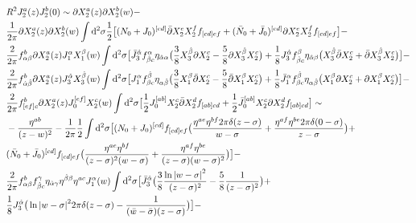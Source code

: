 \documentclass[12pt]{article}
\numberwithin{equation}{section}
\newcommand{\h}[1]{\hat{#1}}
\begin{document}
{\allowdisplaybreaks
\begin{align}
	&R^2 J_2^a(z) J_2^b(0) \sim \partial X_2^a(z) \partial X_2^b(w) - \nonumber \\
	&\frac{1}{2\pi} \partial X_2^a(z) \partial X_2^b(w) \int \dd^2 \sigma \frac{1}{2} \big[(N_0 + J_0)^{[cd]} \bar{\partial} X_2^e X_2 ^f f_{[cd]ef} + (\bar{N}_0 + \bar{J}_0)^{[cd]} \partial X_2^e X_2 ^f f_{[cd]ef}\big]  - \nonumber \\
	&\frac{2}{2\pi}f^{b}_{\alpha \beta} \partial X_2^a(z) J_1^\alpha X_1^\beta(w) \int \dd^2 \sigma \big[\bar{J}_3^{\h{\alpha}} f_{\h{\beta} c}^\alpha \eta_{\h{\alpha}\alpha}\big(\frac{3}{8} X_3^{\h{\beta}} \partial X_2^c - \frac{5}{8} \partial X_3^{\h{\beta}} X_2^c \big)  + \frac{1}{8} J_3^{\h{\alpha}} f_{\h{\beta} c}^\beta \eta_{\h{\alpha}\beta} \big(X_3^{\h{\beta}} \bar{\partial} X_2^c + \bar{\partial} X_3^{\h{\beta}} X_2^c\big) \big] - \nonumber \\
	&\frac{2}{2\pi} f^b_{\h{\alpha}\h{\beta}} \partial X_2^a(z) J_3^{\h{\alpha}} X_3^{\h{\beta}}(w) \int \dd^2 \sigma \big[J_1^\alpha f_{\beta c}^{\h{\beta}} \eta_{\alpha \h{\beta}}\big(\frac{3}{8} X_1^\beta \bar{\partial} X_2^c -\frac{5}{8} \bar{\partial} X_1^\beta X_2^c\big)  + \frac{1}{8}\bar{J}_1^\alpha  f_{\beta c}^{\h{\beta}} \eta_{\alpha \h{\beta}} \big(X_1^\beta \partial X_2^c + \partial X_1^\beta X_2^c \big) \big] - \nonumber \\
	& \frac{2}{2\pi} f^b_{[ef] c} \partial X_2^a(z) J_0^{[ef]} X_2^c(w) \int \dd^2 \sigma \big[\frac{1}{2} J_0^{[ab]} X_2^c \bar{\partial} X_2^d f_{[ab]cd}  + \frac{1}{2} \bar{J}_0^{[ab]} X_2^c \partial X_2^d f_{[ab]cd}\big] \sim
	\nonumber \\& - \frac{\eta^{ab}}{(z-w)^2} - \frac{1}{2\pi} \frac{1}{2} \int \dd^2\sigma \big[(N_0 + J_0)^{[cd]} f_{[cd] ef}\big(\frac{\eta^{a e} \eta^{b f} 2\pi \delta(z-\sigma)}{w-\sigma} + \frac{\eta^{a f}\eta^{be} 2\pi \delta(0-\sigma)}{z-\sigma}\big) + \nonumber \\
		    & (\bar{N}_0 + \bar{J}_0)^{[cd]} f_{[cd] ef} \big(\frac{\eta^{ae} \eta^{bf}}{(z-\sigma)^2 (w-\sigma)} + \frac{\eta^{a f}\eta^{be}}{(z-\sigma)(w-\sigma)^2}\big)\big] -\nonumber \\
		    &\frac{2}{2\pi} f^b_{\alpha \beta} f^\gamma_{\h{\beta} c} \eta_{\h{\alpha}\gamma}  \eta^{\h{\beta}\beta} \eta^{ac} J_1^\alpha(w) \int \dd^2\sigma \big[\bar{J}_3^{\h{\alpha}}\big(\frac{3}{8}\frac{\ln \abs{w-\sigma}^2}{(z-\sigma)^2} - \frac{5}{8} \frac{1}{(z-\sigma)^2}\big) + \nonumber \\
		    &\frac{1}{8}J_3^{\h{\alpha}}\big(\ln \abs{w-\sigma}^2 2\pi \delta(z-\sigma) - \frac{1}{(\bar{w}-\bar{\sigma})(z-\sigma)}\big)\big] - \nonumber \\

\end{align}}
\end{document}
